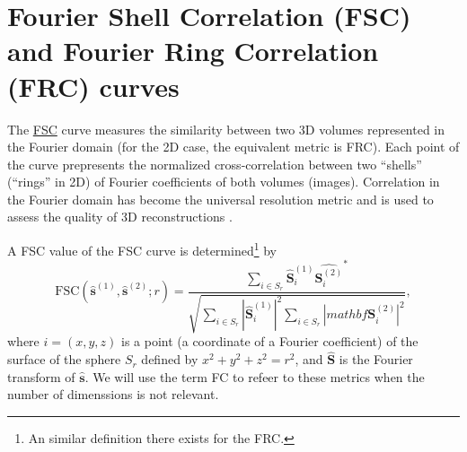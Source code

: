 
\section{Fourier Shell Correlation (FSC) and Fourier Ring
  Correlation (FRC) curves}
\label{sec:fourier_correlation}

The
\href{https://en.wikipedia.org/wiki/Fourier_shell_correlation}{\gls{FSC}}
curve measures the similarity between two 3D volumes represented in
the Fourier domain \cite{verbeke2024self} (for the 2D case, the
equivalent metric is \gls{FRC}). Each point of the curve prepresents
the normalized cross-correlation between two ``shells'' (``rings'' in
2D) of Fourier coefficients of both volumes (images). Correlation in
the Fourier domain has become the universal resolution metric and is
used to assess the quality of 3D reconstructions
\cite{rosenthal2003optimal,scheres2012prevention}.

\begin{comment}
An advantage of correlation in the Fourier domain (FC\footnote{When
  the number of dimensions is not relevant, we will refer to this
  metric simply by FC (Fourier Correlation).}) over other similarity
metrics such as RMSE, SSIM or PPC is that FC values depend on the
frequency, and this can be interesting in some scenarios, such as
microscopy, where the resolution of the microscope is finite and known
a priori \cite{nieuwenhuizen2013measuring}. Notice that, with this
information, we can know whether the denoising is removing the
high-frequency components of the clean signal, or on the contrary,
basically noise.\footnote{When the SNR is very low, the Fourier
  coefficients of the same ring/shell of two different noisy versions
  of the same signal are uncorrelated and therefore, the corresponding
  curves values should be close to zero.}  For this reason, in some
fields such as single particle electron cryo-microscopy (cryo-EM),
\end{comment}

A FSC value of the FSC curve is determined\footnote{An similar
  definition there exists for the FRC.} by~\cite{verbeke2024self}
\begin{equation}
  \text{FSC}(\hat{\mathbf{s}}^{(1)}, \hat{\mathbf{s}}^{(2)}; r) = \frac{\sum_{i \in S_r} \hat{\mathbf{S}}^{(1)}_i \hat{{\mathbf{S}}^{(2)}_i}^*}{\sqrt{\sum_{i \in S_r} |\hat{\mathbf{S}}^{(1)}_i|^2 \sum_{i \in S_r} |mathbf{\mathbf{S}}^{(2)}_i|^2}},
  \label{eq:FSC}
\end{equation}
where $i=(x, y, z)$ is a point (a coordinate of a Fourier coefficient)
of the surface of the sphere $S_r$ defined by $x^2+y^2+z^2=r^2$, and
$\hat{\mathbf{S}}$ is the Fourier transform of $\hat{\mathbf{s}}$. We
will use the term \gls{FC} to refeer to these metrics when the number
of dimenssions is not relevant.


